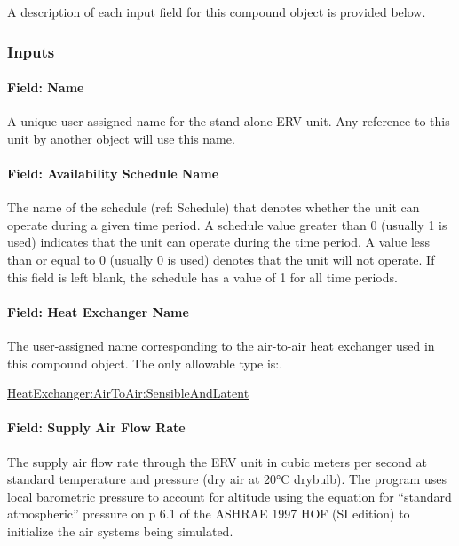 A description of each input field for this compound object is provided below.

\subsubsection{Inputs}\label{inputs-13-018}

\paragraph{Field: Name}\label{field-name-13-012}

A unique user-assigned name for the stand alone ERV unit. Any reference to this unit by another object will use this name.

\paragraph{Field: Availability Schedule Name}\label{field-availability-schedule-name-12-001}

The name of the schedule (ref: Schedule) that denotes whether the unit can operate during a given time period. A schedule value greater than 0 (usually 1 is used) indicates that the unit can operate during the time period. A value less than or equal to 0 (usually 0 is used) denotes that the unit will not operate. If this field is left blank, the schedule has a value of 1 for all time periods.

\paragraph{Field: Heat Exchanger Name}\label{field-heat-exchanger-name-002}

The user-assigned name corresponding to the air-to-air heat exchanger used in this compound object. The only allowable type is:.

\hyperref[heatexchangerairtoairsensibleandlatent]{HeatExchanger:AirToAir:SensibleAndLatent}

\paragraph{Field: Supply Air Flow Rate}\label{field-supply-air-flow-rate-000}

The supply air flow rate through the ERV unit in cubic meters per second at standard temperature and pressure (dry air at 20\si{\degreeCelsius} drybulb). The program uses local barometric pressure to account for altitude using the equation for ``standard atmospheric'' pressure on p 6.1 of the ASHRAE 1997 HOF (SI edition) to initialize the air systems being simulated.

